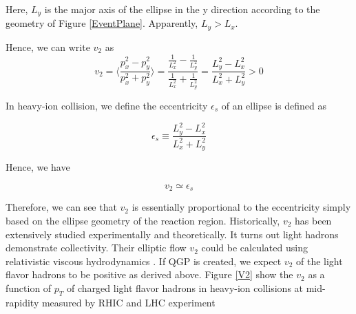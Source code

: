 Here,  $L_y$ is the major axis of the ellipse in the y direction according to the geometry of Figure \ref{EventPlane}. Apparently, $L_y > L_x$. 

Hence, we can write $v_2$ as 
\begin{equation}
v_2 =  \langle \frac{p_x^2 - p_y^2}{p_x^2 + p_y^2} \rangle = \frac{\frac{1}{L_x^2} - \frac{1}{L_y^2}}{\frac{1}{L_x^2} + \frac{1}{L_y^2}} =  \frac{L_y^2 - L_x^2}{L_x^2 + L_y^2}  > 0
\end{equation}

In heavy-ion collision, we define the eccentricity $\epsilon_s$ of an ellipse is defined as \cite{V2Eccent}

\begin{equation}
\epsilon_s \equiv \frac{L_y^2 - L_x^2}{L_x^2 + L_y^2}
\end{equation}

Hence, we have

\begin{equation}
v_2 \simeq \epsilon_s
\end{equation}

Therefore, we can see that $v_2$ is essentially proportional to the eccentricity simply based on the ellipse geometry of the reaction region. Historically, $v_2$ has been extensively studied experimentally and theoretically. It turns out light hadrons demonstrate collectivity. Their elliptic flow $v_2$ could be calculated using relativistic viscous hydrodynamics \cite{4DHydro}. If QGP is created, we expect $v_2$ of the light flavor hadrons to be positive as derived above. Figure \ref{V2} show the $v_2$ as a function of $p_T$ of charged light flavor hadrons in heavy-ion collisions at mid-rapidity measured by RHIC and LHC experiment \cite{V2STAR,V2ALICE}

